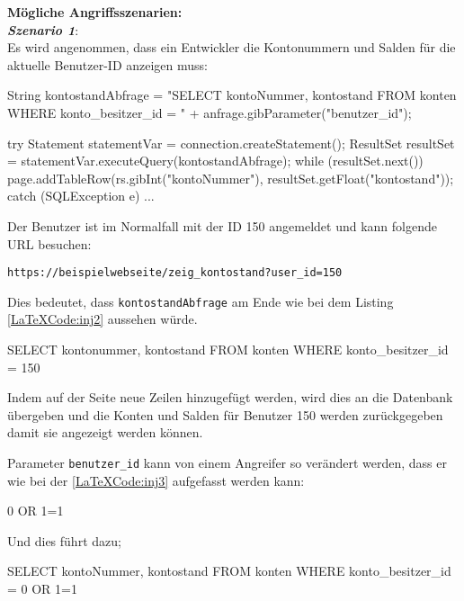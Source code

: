 \textbf{Mögliche Angriffsszenarien:}\\

\textbf{\textit{Szenario 1}}:\\
Es wird angenommen, dass ein Entwickler die Kontonummern und Salden für die aktuelle Benutzer-ID anzeigen muss\cite{vcinj16}:\\


\begin{LaTeXCode}[caption={SQL Abfrage Beispiel 1},captionpos=b, label=LaTeXCode:inj1][numbers=none]
String kontostandAbfrage = 
"SELECT kontoNummer, kontostand FROM konten WHERE konto\_besitzer\_id = " 
+ anfrage.gibParameter("benutzer_id");

try
{
	Statement statementVar = connection.createStatement();
	ResultSet resultSet = statementVar.executeQuery(kontostandAbfrage);
	while (resultSet.next()) {
		page.addTableRow(rs.gibInt("kontoNummer"), resultSet.getFloat("kontostand"));
	}
} catch (SQLException e) { ... }
\end{LaTeXCode}

Der Benutzer ist im Normalfall mit der ID 150 angemeldet und kann folgende URL besuchen:

\texttt{https://beispielwebseite/zeig\_kontostand?user\_id=150}

Dies bedeutet, dass \texttt{kontostandAbfrage} am Ende wie bei dem Listing \ref{LaTeXCode:inj2} aussehen würde.

\begin{LaTeXCode}[caption={Kontostand Abfrage},captionpos=b, label=LaTeXCode:inj2][numbers=none]
SELECT kontonummer, kontostand FROM konten WHERE konto_besitzer_id = 150
\end{LaTeXCode}

Indem auf der Seite neue Zeilen hinzugefügt werden, wird dies an die Datenbank übergeben und die Konten und Salden für Benutzer 150 werden zurückgegeben damit sie angezeigt werden können.

Parameter \texttt{benutzer\_id} kann von einem Angreifer so verändert werden, dass er wie bei der \ref{LaTeXCode:inj3} aufgefasst werden kann:

\begin{LaTeXCode}[caption={Parameter},captionpos=b, label=LaTeXCode:inj3][numbers=none]
0 OR 1=1
\end{LaTeXCode}

Und dies führt dazu;

	\begin{LaTeXCode}[caption={Kontostand Abfrage},captionpos=b, label=LaTeXCode:inj4][numbers=none]
SELECT kontoNummer, kontostand FROM konten WHERE konto_besitzer_id = 0 OR 1=1
\end{LaTeXCode}

